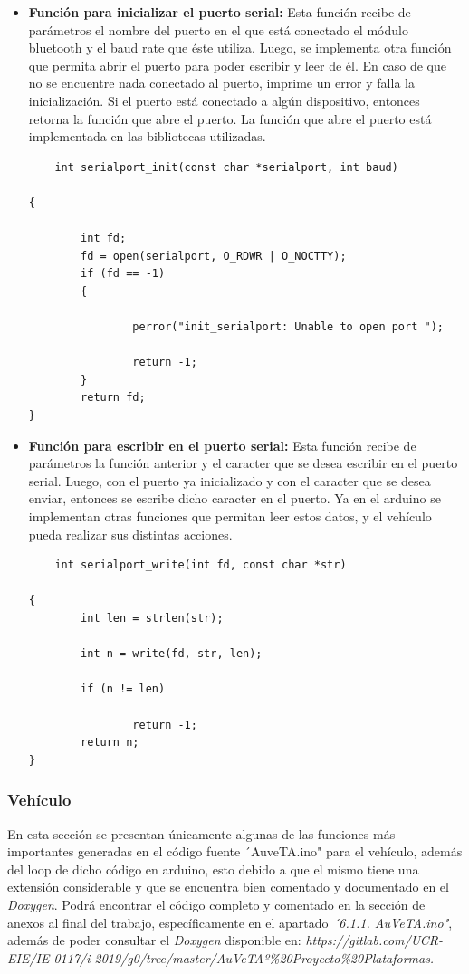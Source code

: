 \begin{itemize}
    \item\textbf{Función para inicializar el puerto serial:}
    Esta función recibe de parámetros el nombre del puerto en el que está conectado el módulo bluetooth y el baud rate que éste utiliza. Luego, se implementa otra función que permita abrir el puerto para poder escribir y leer de él. En caso de que no se encuentre nada conectado al puerto, imprime un error y falla la inicialización. Si el puerto está conectado a algún dispositivo, entonces retorna la función que abre el puerto. La función que abre el puerto está implementada en las bibliotecas utilizadas.
    \begin{lstlisting}
    int serialport_init(const char *serialport, int baud)

{

        int fd;
        fd = open(serialport, O_RDWR | O_NOCTTY);
        if (fd == -1)
        {

                perror("init_serialport: Unable to open port ");

                return -1;
        }
        return fd;
}
    \end{lstlisting}
    \item\textbf{Función para escribir en el puerto serial:} Esta función recibe de parámetros la función anterior y el caracter que se desea escribir en el puerto serial. Luego, con el puerto ya inicializado y con el caracter que se desea enviar, entonces se escribe dicho caracter en el puerto. Ya en el arduino se implementan otras funciones que permitan leer estos datos, y el vehículo pueda realizar sus distintas acciones.
    \begin{lstlisting}
    int serialport_write(int fd, const char *str)

{
        int len = strlen(str);

        int n = write(fd, str, len);

        if (n != len)

                return -1;
        return n;
}
    \end{lstlisting}
\end{itemize}

\subsubsection{Vehículo}
En esta sección se presentan únicamente algunas de las funciones más importantes generadas en el código fuente \´´AuveTA.ino"  para el vehículo, además del loop de dicho código en arduino, esto debido a que el mismo tiene una extensión considerable y que se encuentra bien comentado y documentado en el \textit{Doxygen}. Podrá encontrar el código completo y comentado en la sección de anexos al final del trabajo, específicamente en el apartado \textit{\´´6.1.1. AuVeTA.ino"}, además de poder consultar el \textit{Doxygen} disponible en: \textit{https://gitlab.com/UCR-EIE/IE-0117/i-2019/g0/tree/master/AuVeTAº\%20Proyecto\%20Plataformas. }

